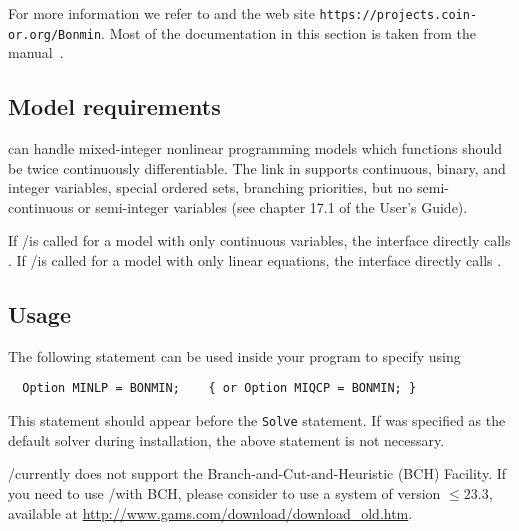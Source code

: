 For more information we refer to \cite{BoGo08,BoKiLi09,BBCCGLLLMSW,BoCoLoMa06} and the \BONMIN web site \texttt{https://projects.coin-or.org/Bonmin}.
Most of the \BONMIN documentation in this section is taken from the \BONMIN manual~\cite{BonminManual}.


\subsection{Model requirements}

\BONMIN can handle mixed-integer nonlinear programming models which functions should be twice continuously differentiable.
The \BONMIN link in \GAMS supports continuous, binary, and integer variables, special ordered sets, branching priorities, but no semi-continuous or semi-integer variables (see chapter 17.1 of the \GAMS User's Guide).

If \GAMS/\BONMIN is called for a model with only continuous variables, the interface directly calls \IPOPT.
If \GAMS/\BONMIN is called for a model with only linear equations, the interface directly calls \CBC.

\subsection{Usage}

The following statement can be used inside your \GAMS program to specify using \BONMIN
\begin{verbatim}
  Option MINLP = BONMIN;    { or Option MIQCP = BONMIN; }
\end{verbatim}
This statement should appear before the \texttt{Solve} statement.
If \BONMIN was specified as the default solver during \GAMS installation, the above statement is not necessary.

\GAMS/\BONMIN currently does not support the \GAMS Branch-and-Cut-and-Heuristic (BCH) Facility.
If you need to use \GAMS/\BONMIN with BCH, please consider to use a \GAMS system of version $\leq 23.3$, available at \url{http://www.gams.com/download/download_old.htm}.

